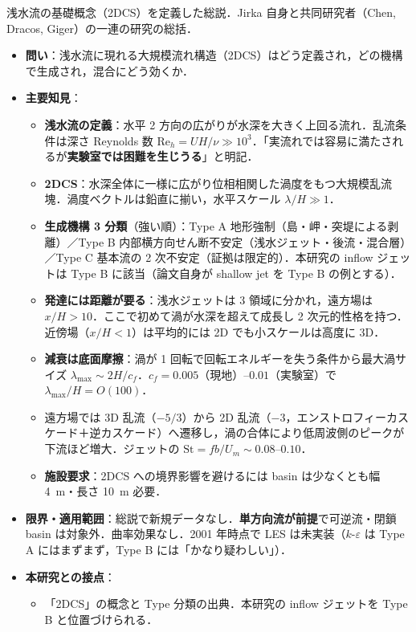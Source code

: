 \documentclass[11pt]{jsarticle}
\newcommand{\litref}[1]{{\large\bfseries\color{citecolor}#1}}
\begin{document}
\noindent\litref{Jirka (2001)}\quad 浅水流の基礎概念（2DCS）を定義した総説．Jirka 自身と共同研究者（Chen, Dracos, Giger）の一連の研究の総括．
\begin{itemize}
  \item \textbf{問い}：浅水流に現れる大規模流れ構造（2DCS）はどう定義され，どの機構で生成され，混合にどう効くか．
  \item \textbf{主要知見}：
  \begin{itemize}
    \item \textbf{浅水流の定義}：水平 2 方向の広がりが水深を大きく上回る流れ．乱流条件は深さ Reynolds 数 $\mathrm{Re}_h = UH/\nu \gg 10^3$．「実流れでは容易に満たされるが\textbf{実験室では困難を生じうる}」と明記．
    \item \textbf{2DCS}：水深全体に一様に広がり位相相関した渦度をもつ大規模乱流塊．渦度ベクトルは鉛直に揃い，水平スケール $\lambda/H \gg 1$．
    \item \textbf{生成機構 3 分類}（強い順）：Type A 地形強制（島・岬・突堤による剥離）／Type B 内部横方向せん断不安定（浅水ジェット・後流・混合層）／Type C 基本流の 2 次不安定（証拠は限定的）．本研究の inflow ジェットは Type B に該当（論文自身が shallow jet を Type B の例とする）．
    \item \textbf{発達には距離が要る}：浅水ジェットは 3 領域に分かれ，遠方場は $x/H > 10$．ここで初めて渦が水深を超えて成長し 2 次元的性格を持つ．近傍場（$x/H < 1$）は平均的には 2D でも小スケールは高度に 3D．
    \item \textbf{減衰は底面摩擦}：渦が 1 回転で回転エネルギーを失う条件から最大渦サイズ $\lambda_\mathrm{max} \sim 2H/c_f$．$c_f = 0.005$（現地）--$0.01$（実験室）で $\lambda_\mathrm{max}/H = O(100)$．
    \item 遠方場では 3D 乱流（$-5/3$）から 2D 乱流（$-3$，エンストロフィーカスケード＋逆カスケード）へ遷移し，渦の合体により低周波側のピークが下流ほど増大．ジェットの $\mathrm{St} = fb/U_m \sim 0.08$--$0.10$．
    \item \textbf{施設要求}：2DCS への境界影響を避けるには basin は少なくとも幅 4~m・長さ 10~m 必要．
  \end{itemize}
  \item \textbf{限界・適用範囲}：総説で新規データなし．\textbf{単方向流が前提}で可逆流・閉鎖 basin は対象外．曲率効果なし．2001 年時点で LES は未実装（$k$-$\varepsilon$ は Type A にはまずまず，Type B には「かなり疑わしい」）．
  \item \textbf{本研究との接点}：
  \begin{itemize}
    \item 「2DCS」の概念と Type 分類の出典．本研究の inflow ジェットを Type B と位置づけられる．

\end{itemize}
\end{itemize}
\end{document}

